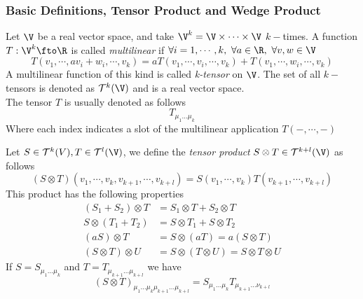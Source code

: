 \documentclass[../mmf.tex]{subfiles}
\begin{document}
\subsubsection{Basic Definitions, Tensor Product and Wedge Product}
\begin{dfn}
	Let $\V$ be a real vector space, and take $\V^k=\V\times\cdots\times\V$ $k-$times. A function $T:\V^k\fto\R$ is called \textit{multilinear} if $\forall i=1,\cdots,k,\ \forall a\in\R,\ \forall v,w\in\V$
	\begin{equation}
		T(v_1,\cdots,av_i+w_i,\cdots,v_k)=aT(v_1,\cdots,v_i,\cdots,v_k)+T(v_1,\cdots,w_i,\cdots,v_k)
		\label{eq:multilinearapp}
	\end{equation}
	A multilinear function of this kind is called \textit{k-tensor} on $\V$. The set of all $k-$tensors is denoted as $\mathcal{T}^k(\V)$ and is a real vector space.\\
	The tensor $T$ is usually denoted as follows
	\begin{equation}
		T_{\mu_1\ldots\mu_k}
		\label{eq:ktensordef}
	\end{equation}
	Where each index indicates a slot of the multilinear application $T(-,\cdots,-)$
\end{dfn}
\begin{dfn}
	Let $S\in\mathcal{T}^k(V),T\in\mathcal{T}^l(\V)$, we define the \textit{tensor product} $S\otimes T\in\mathcal{T}^{k+l}(\V)$ as follows
	\begin{equation}
		(S\otimes T)(v_1,\cdots,v_k,v_{k+1},\cdots,v_{k+l})=S(v_1,\cdots,v_k)T(v_{k+1},\cdots,v_{k+l})
		\label{eq:tensorprod}
	\end{equation}
	This product has the following properties
	\begin{equation}
		\begin{aligned}
			\left( S_1+S_2 \right)\otimes T&=S_1\otimes T+S_2\otimes T\\
			S\otimes(T_1+T_2)&=S\otimes T_1+S\otimes T_2\\
			(aS)\otimes T&=S\otimes(aT)=a(S\otimes T)\\
			(S\otimes T)\otimes U&= S\otimes(T\otimes U)=S\otimes T\otimes U
		\end{aligned}
		\label{eq:properties}
	\end{equation}
	If $S=S_{\mu_1\ldots\mu_k}$ and $T=T_{\mu_{k+1}\ldots\mu_{k+l}}$ we have
	\begin{equation}
		(S\otimes T)_{\mu_1\ldots\mu_k\mu_{k+1}\ldots\mu_{k+l}}=S_{\mu_1\ldots\mu_k}T_{\mu_{k+1}\ldots\nu_{k+l}}
		\label{eq:tensorprodein}
	\end{equation}
\end{dfn}
\end{document}

